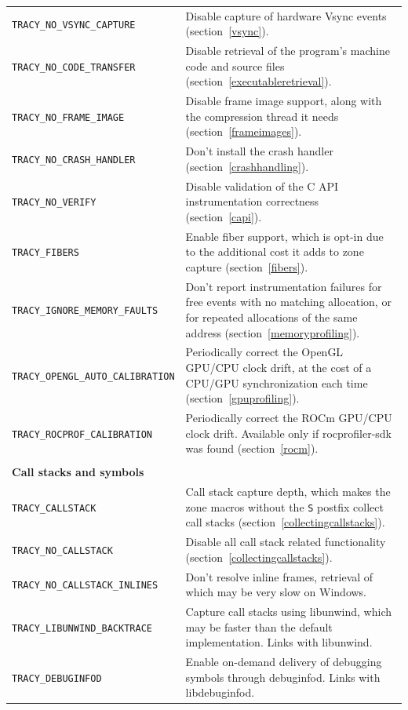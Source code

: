 \documentclass[hidelinks,titlepage,a4paper,twoside]{article}
\begin{document}
\begin{footnotesize}
\begin{longtable}{@{}p{}p{}@{}}
\texttt{TRACY\_NO\_VSYNC\_CAPTURE} & Disable capture of hardware Vsync events (section~\ref{vsync}). \\
\texttt{TRACY\_NO\_CODE\_TRANSFER} & Disable retrieval of the program's machine code and source files (section~\ref{executableretrieval}). \\
\texttt{TRACY\_NO\_FRAME\_IMAGE} & Disable frame image support, along with the compression thread it needs (section~\ref{frameimages}). \\
\texttt{TRACY\_NO\_CRASH\_HANDLER} & Don't install the crash handler (section~\ref{crashhandling}). \\
\texttt{TRACY\_NO\_VERIFY} & Disable validation of the C API instrumentation correctness (section~\ref{capi}). \\
\texttt{TRACY\_FIBERS} & Enable fiber support, which is opt-in due to the additional cost it adds to zone capture (section~\ref{fibers}). \\
\texttt{TRACY\_IGNORE\_MEMORY\_FAULTS} & Don't report instrumentation failures for free events with no matching allocation, or for repeated allocations of the same address (section~\ref{memoryprofiling}). \\
\texttt{TRACY\_OPENGL\_AUTO\_CALIBRATION} & Periodically correct the OpenGL GPU/CPU clock drift, at the cost of a CPU/GPU synchronization each time (section~\ref{gpuprofiling}). \\
\texttt{TRACY\_ROCPROF\_CALIBRATION} & Periodically correct the ROCm GPU/CPU clock drift. Available only if rocprofiler-sdk was found (section~\ref{rocm}). \\
& \\
\textbf{Call stacks and symbols} & \\
\texttt{TRACY\_CALLSTACK} & Call stack capture depth, which makes the zone macros without the \texttt{S} postfix collect call stacks (section~\ref{collectingcallstacks}). \\
\texttt{TRACY\_NO\_CALLSTACK} & Disable all call stack related functionality (section~\ref{collectingcallstacks}). \\
\texttt{TRACY\_NO\_CALLSTACK\_INLINES} & Don't resolve inline frames, retrieval of which may be very slow on Windows. \\
\texttt{TRACY\_LIBUNWIND\_BACKTRACE} & Capture call stacks using libunwind, which may be faster than the default implementation. Links with libunwind. \\
\texttt{TRACY\_DEBUGINFOD} & Enable on-demand delivery of debugging symbols through debuginfod. Links with libdebuginfod. \\

\end{longtable}
\end{footnotesize}
\end{document}
